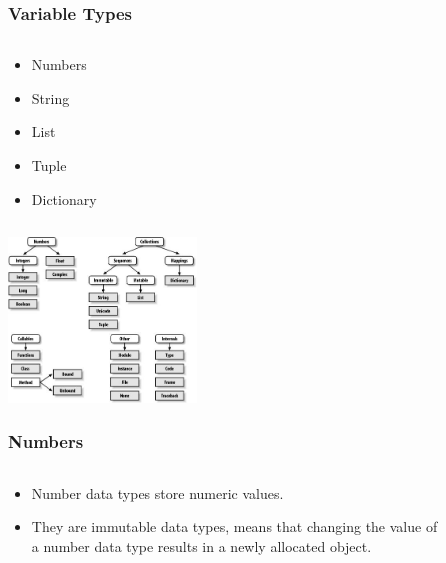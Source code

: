 \documentclass{beamer}
\begin{document}
\begin{frame}
\frametitle{Variable Types}
\begin{columns}[c]
	\begin{column}{30cm}
		\vspace{.1cm}
		\begin{itemize}
			\justifying
			\item Numbers
			\item String
			\item List
			\item Tuple
			\item Dictionary
		\end{itemize}
	\end{column}
\end{columns}
	\vspace{.5cm}
	\hspace*{5.5cm} \includegraphics[width=5cm]{figs/python-types.jpg}
\end{frame}

\begin{frame}
	\frametitle{Numbers}
	\begin{columns}[c]
		\begin{column}{30cm}
			\vspace{.1cm}
			\begin{itemize}
				\justifying
				\item Number data types store numeric values.
				\item They are immutable data types, means that changing the value of \\
				 a number data type results in a newly allocated object.
			\end{itemize}
		\end{column}
	\end{columns}

\end{frame}
\end{document}
